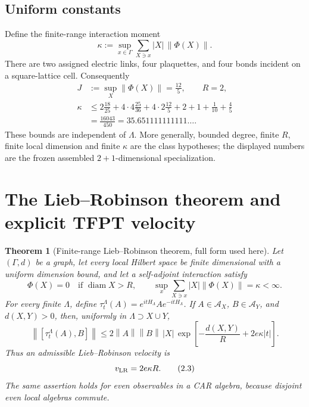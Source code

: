 \documentclass[11pt]{article}
\newtheorem{theorem}{Theorem}[section]
\theoremstyle{remark}
\newcommand{\A}{\mathcal A}
\newcommand{\diam}{\operatorname{diam}}
\newcommand{\norm}[1]{\left\lVert#1\right\rVert}
\begin{document}
\subsection{Uniform constants}

Define the finite-range interaction moment
\[
 \kappa:=\sup_{x\in\Gamma}
 \sum_{X\ni x}|X|\,\norm{\Phi(X)}.
\tag{1.5}\label{eq:kappa}
\]
There are two assigned electric links, four plaquettes, and four bonds
incident on a square-lattice cell.  Consequently
\[
\begin{aligned}
 J&:=\sup_X\norm{\Phi(X)}=\frac{12}{5},\qquad R=2,\\
 \kappa
 &\leq
 2\frac{18}{25}
 +4\cdot4\frac{25}{36}
 +4\cdot2\frac{12}{5}
 +2+1+\frac1{10}+\frac45\\
 &=\frac{16043}{450}=35.651111111111\ldots .
\end{aligned}
\tag{1.6}\label{eq:constants}
\]
These bounds are independent of \(\Lambda\).  More generally, bounded
degree, finite \(R\), finite local dimension and finite \(\kappa\) are the
class hypotheses; the displayed numbers are the frozen assembled
\(2+1\)-dimensional specialization.

\section{The Lieb--Robinson theorem and explicit TFPT velocity}

\begin{theorem}[Finite-range Lieb--Robinson theorem, full form used here]
\label{thm:LRclassical}
Let \((\Gamma,d)\) be a graph, let every local Hilbert space be finite
dimensional with a uniform dimension bound, and let a self-adjoint
interaction satisfy
\[
 \Phi(X)=0\quad\text{if }\diam X>R,\qquad
 \sup_x\sum_{X\ni x}|X|\norm{\Phi(X)}=\kappa<\infty.
\tag{2.1}\label{eq:LRhyp}
\]
For every finite \(\Lambda\), define
\(\tau_t^\Lambda(A)=e^{itH_\Lambda}Ae^{-itH_\Lambda}\).
If \(A\in\A_X\), \(B\in\A_Y\), and \(d(X,Y)>0\), then, uniformly in
\(\Lambda\supset X\cup Y\),
\[
 \norm{[\tau_t^\Lambda(A),B]}
 \leq
 2\norm A\norm B\,|X|\,
 \exp\!\left[-\frac{d(X,Y)}R+2e\kappa|t|\right].
\tag{2.2}\label{eq:LR}
\]
Thus an admissible Lieb--Robinson velocity is
\[
 v_{\rm LR}=2e\kappa R.
\tag{2.3}\label{eq:vLR}
\]
The same assertion holds for even observables in a CAR algebra, because
disjoint even local algebras commute.
\end{theorem}
\end{document}
